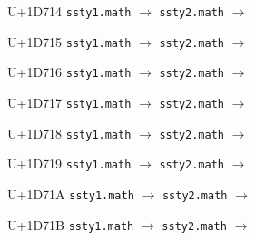 \documentclass{article}
\begin{document}
\begin{substitutions}
\goodbreak

U+1D714  \linebreak
    \texttt{ssty1.math} $\to$  \linebreak
    \texttt{ssty2.math} $\to$  

\goodbreak

U+1D715  \linebreak
    \texttt{ssty1.math} $\to$  \linebreak
    \texttt{ssty2.math} $\to$  

\goodbreak

U+1D716  \linebreak
    \texttt{ssty1.math} $\to$  \linebreak
    \texttt{ssty2.math} $\to$  

\goodbreak

U+1D717  \linebreak
    \texttt{ssty1.math} $\to$  \linebreak
    \texttt{ssty2.math} $\to$  

\goodbreak

U+1D718  \linebreak
    \texttt{ssty1.math} $\to$  \linebreak
    \texttt{ssty2.math} $\to$  

\goodbreak

U+1D719  \linebreak
    \texttt{ssty1.math} $\to$  \linebreak
    \texttt{ssty2.math} $\to$  

\goodbreak

U+1D71A  \linebreak
    \texttt{ssty1.math} $\to$  \linebreak
    \texttt{ssty2.math} $\to$  

\goodbreak

U+1D71B  \linebreak
    \texttt{ssty1.math} $\to$  \linebreak
    \texttt{ssty2.math} $\to$  

\goodbreak

\end{substitutions}

\clearpage

\end{document}

